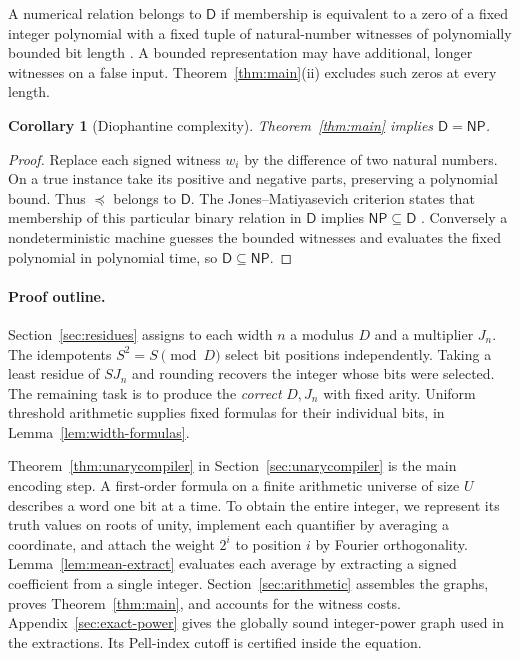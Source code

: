 \documentclass[11pt,letterpaper]{article}
\newtheorem{corollary}[theorem]{Corollary}
\numberwithin{equation}{section}
\newcommand{\DD}{\mathsf D}
\newcommand{\NP}{\mathsf{NP}}
\begin{document}
A numerical relation belongs to $\DD$ if membership is equivalent to a zero of a fixed integer polynomial with a fixed tuple of natural-number witnesses of polynomially bounded bit length \cite{am,pollett,lipmaa}. A bounded representation may have additional, longer witnesses on a false input. Theorem~\ref{thm:main}(ii) excludes such zeros at every length.

\begin{corollary}[Diophantine complexity]\label{cor:classes}
Theorem~\ref{thm:main} implies $\DD=\NP$.
\end{corollary}
\begin{proof}
Replace each signed witness $w_i$ by the difference of two natural numbers. On a true instance take its positive and negative parts, preserving a polynomial bound. Thus $\preceq$ belongs to $\DD$. The Jones--Matiyasevich criterion states that membership of this particular binary relation in $\DD$ implies $\NP\subseteq\DD$ \cite{jm,pollett,lipmaa}. Conversely a nondeterministic machine guesses the bounded witnesses and evaluates the fixed polynomial in polynomial time, so $\DD\subseteq\NP$.
\end{proof}

\clearpage
\paragraph{Proof outline.}
Section~\ref{sec:residues} assigns to each width $n$ a modulus $D$ and a multiplier $J_n$. The idempotents $S^2=S\pmod D$ select bit positions independently. Taking a least residue of $SJ_n$ and rounding recovers the integer whose bits were selected. The remaining task is to produce the \emph{correct} $D,J_n$ with fixed arity. Uniform threshold arithmetic supplies fixed formulas for their individual bits, in Lemma~\ref{lem:width-formulas}.

Theorem~\ref{thm:unarycompiler} in Section~\ref{sec:unarycompiler} is the main encoding step. A first-order formula on a finite arithmetic universe of size $U$ describes a word one bit at a time. To obtain the entire integer, we represent its truth values on roots of unity, implement each quantifier by averaging a coordinate, and attach the weight $2^i$ to position $i$ by Fourier orthogonality. Lemma~\ref{lem:mean-extract} evaluates each average by extracting a signed coefficient from a single integer. Section~\ref{sec:arithmetic} assembles the graphs, proves Theorem~\ref{thm:main}, and accounts for the witness costs. Appendix~\ref{sec:exact-power} gives the globally sound integer-power graph used in the extractions. Its Pell-index cutoff is certified inside the equation.
\end{document}
